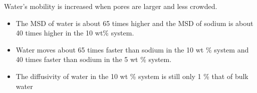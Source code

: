 \documentclass{article}
\begin{document}
  \noindent Water's mobility is increased when pores are larger and less crowded.
  \begin{itemize}
    \item The MSD of water is about 65 times higher and the MSD of sodium is about 40
    times higher in the 10 wt\% system.
    \item Water moves about 65 times faster than sodium in the 10 wt \% system and
    40 times faster than sodium in the 5 wt \% system. %
    \item The diffusivity of water in the 10 wt \% system is still only 1 \% that of 
    bulk water %
  \end{itemize}
  
  
  
\end{document}
